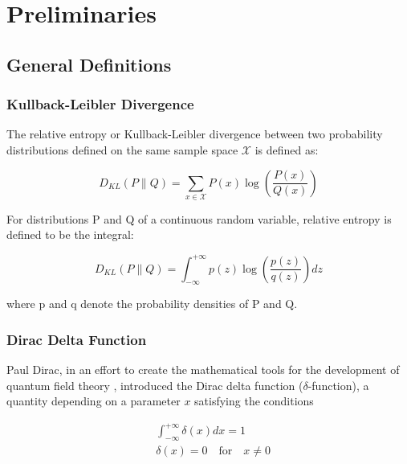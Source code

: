 \setcounter{chapter}{0}

\chapter{Preliminaries}
\thispagestyle{chapterfancy}

\section{General Definitions}

\subsection{Kullback-Leibler Divergence}\label{ch:KLD}
The relative entropy or Kullback-Leibler divergence between two probability distributions defined on the same sample space $\mathcal{X}$ is defined  \cite{mackay2003information} as:

\begin{equation}
    D_{KL}(P \| Q) = \sum_{x\in\mathcal{X}} P(x) \log\left(\frac{P(x)}{Q(x)}\right)
\end{equation}

\noindent For distributions P and Q of a continuous random variable, relative entropy is defined \cite{bishop2006pattern} to be the integral:

\begin{equation}
    D_{KL}(P \| Q) = \int_{-\infty}^{+\infty} p(z) \log\left(\frac{p(z)}{q(z)}\right)dz
\end{equation}

\noindent where p and q denote the probability densities of P and Q.

\subsection{Dirac Delta Function}\label{ch:Dirac}
Paul Dirac, in an effort to create the mathematical tools for the development of quantum field theory \cite{dirac1981principles}, introduced the Dirac delta function ($\delta$-function), a quantity depending on a parameter $x$ satisfying the conditions

\begin{equation}
    \begin{aligned} 
    & \int_{-\infty}^{+\infty} \delta(x) d x=1 \\
    & \delta(x)=0 \quad \text{for}\quad x \neq 0
    \end{aligned}
\end{equation}

